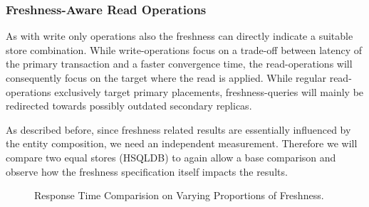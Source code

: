 
\subsubsection{Freshness-Aware Read Operations}

As with write only operations also the freshness can directly indicate a suitable store combination.
While write-operations focus on a trade-off between latency of the primary transaction and a faster convergence time,
the read-operations will consequently focus on the target where the read is applied. While regular read-operations exclusively target
primary placements, freshness-queries will mainly be redirected towards possibly outdated secondary replicas.


As described before, since freshness related results are essentially influenced by the entity composition, we need an independent measurement.
Therefore we will  compare two equal stores (HSQLDB) to again allow a base comparison and observe how the freshness specification itself impacts the results.


\begin{figure}[t] 
    \centering 
    \caption{Response Time Comparision on Varying Proportions of Freshness.}
    \label{fig:fresh0}
\end{figure}



